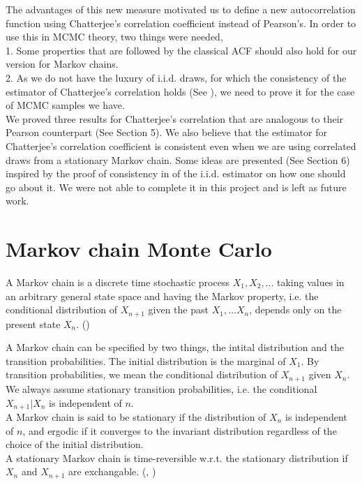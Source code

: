 \documentclass{article}
\begin{document}
	The advantages of this new measure motivated us to define a new autocorrelation function using Chatterjee's correlation coefficient instead of Pearson's.
	In order to use this in MCMC theory, two things were needed,\\
	1. Some properties that are followed by the classical ACF should also hold for our version for Markov chains.\\
	2. As we do not have the luxury of i.i.d. draws, for which the consistency of the estimator of Chatterjee's correlation holds (See \cite{chatterjee2020sourav}),
		we need to prove it for the case of MCMC samples we have.\\
	We proved three results for Chatterjee's correlation that are analogous to their Pearson counterpart (See Section 5).
	We also believe that the estimator for Chatterjee's correlation coefficient is consistent even when we are using correlated draws from a stationary Markov chain.
	Some ideas are presented (See Section 6) inspired by the proof of consistency in \cite{chatterjee2020sourav} of the i.i.d. estimator on how one should go about it.
	We were not able to complete it in this project and is left as future work.

\section{Markov chain Monte Carlo}
	A Markov chain is a discrete time stochastic process $X_1, X_2, \dots$ taking values in an arbitrary general state space and having the Markov property,
	i.e. the conditional distribution of $X_{n+1}$ given the past $X_1, \dots X_n$, depends only on the present state $X_n$. (\cite{vats2017multivariate})

	A Markov chain can be specified by two things, the intital distribution and the transition probabilities.
	The initial distribution is the marginal of $X_1$. By transition probabilities, we mean the conditional distribution of $X_{n+1}$ given $X_n$.
	We always assume stationary transition probabilities, i.e. the conditional $X_{n+1}|X_n$ is independent of $n$.\\
	A Markov chain is said to be stationary if the distribution of $X_n$ is independent of $n$,
	and ergodic if it converges to the invariant distribution regardless of the choice of the initial distribution.\\
	A stationary Markov chain is time-reversible w.r.t. the stationary distribution if $X_n$ and $X_{n+1}$ are exchangable. (\cite{geyer2005charles}, \cite{mcmc2011handbook})
\end{document}
